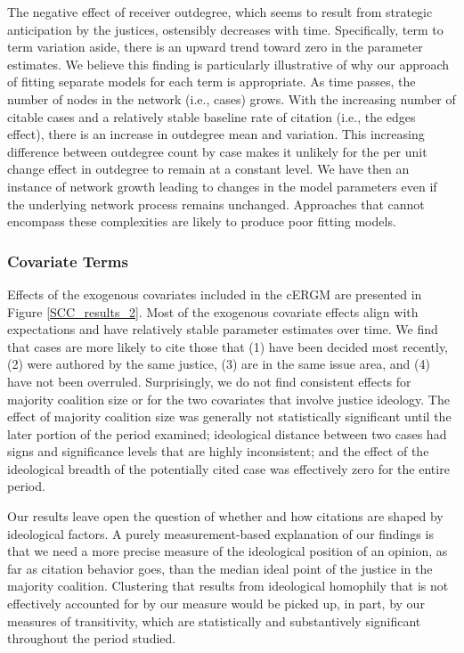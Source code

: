\documentclass{cup-pan}
\begin{document}
The negative effect of receiver outdegree, which seems to result from strategic anticipation by the justices, ostensibly decreases with time. Specifically, term to term variation aside, there is an upward trend toward zero in the parameter estimates. We believe this finding is particularly illustrative of why our approach of fitting separate models for each term is appropriate. As time passes, the number of nodes in the network (i.e., cases) grows. With the increasing number of citable cases and a relatively stable baseline rate of citation (i.e., the edges effect), there is an increase in outdegree mean and variation. This increasing difference between outdegree count by case makes it unlikely for the per unit change effect in outdegree to remain at a constant level. We have then an instance of network growth leading to changes in the model parameters even if the underlying network process remains unchanged. Approaches that cannot encompass these complexities are likely to produce poor fitting models.

\subsubsection{Covariate Terms}
Effects of the exogenous covariates included in the cERGM are presented in Figure \ref{SCC_results_2}. Most of the exogenous covariate effects align with expectations and have relatively stable parameter estimates over time. We find that cases are more likely to cite those that (1) have been decided most recently, (2) were authored by the same justice, (3) are in the same issue area, and (4) have not been overruled. Surprisingly, we do not find consistent effects for majority coalition size or for the two covariates that involve justice ideology. The effect of majority coalition size was generally not statistically significant until the later portion of the period examined; ideological distance between two cases had signs and significance levels that are highly inconsistent; and the effect of the ideological breadth of the potentially cited case was effectively zero for the entire period. 

Our results leave open the question of whether and how citations are shaped by ideological factors. A purely measurement-based explanation of our findings is that we need a more precise measure of the ideological position of an opinion, as far as citation behavior goes, than the median ideal point of the justice in the majority coalition. Clustering that results from ideological homophily that is not effectively accounted for by our measure would be picked up, in part, by our measures of transitivity, which are statistically and substantively significant throughout the period studied. 
\end{document}
